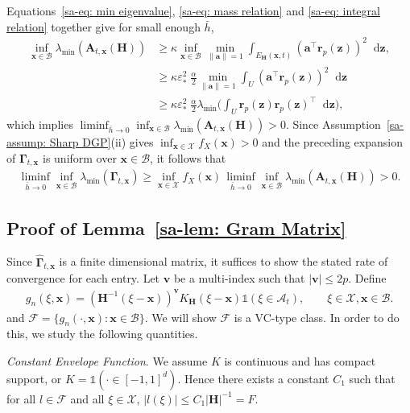 \documentclass[10pt]{article}
\newcommand{\Indicator}{\mathds{1}}
\newcommand{\dif}{\mathop{}\!\mathrm{d}}
\newcommand{\norm}[1]{\left\lVert#1\right\rVert}
\newcommand{\ba}{\mathbf{a}}
\newcommand{\bA}{\mathbf{A}}
\newcommand{\bH}{\mathbf{H}}
\newcommand{\br}{\mathbf{r}}
\newcommand{\bv}{\mathbf{v}}
\newcommand{\bx}{\mathbf{x}}
\newcommand{\bz}{\mathbf{z}}
\newcommand{\bGamma}{\boldsymbol{\Gamma}}
\newcommand{\A}{\mathcal{A}}
\newcommand{\B}{\mathcal{B}}
\newcommand{\F}{\mathcal{F}}
\newcommand{\X}{\mathcal{X}}
\begin{document}
Equations~\eqref{sa-eq: min eigenvalue}, \eqref{sa-eq: mass relation} and \eqref{sa-eq: integral relation} together give for small enough $\bar{h}$,
\begin{align*}
    \inf_{\bx \in \B}\lambda_{\min}(\bA_{t,\bx}(\bH))
    & \geq \kappa \inf_{\bx \in \B}\min_{\norm{\ba} = 1} \int_{E_{\bH}(\bx,t)} (\ba^{\top} \br_p(\bz))^2   \dif \bz, \\
    & \geq \kappa \varepsilon_*^2 \; \frac{\alpha}{2}  \min_{\norm{\ba} = 1} \int_{U} (\ba^{\top} \br_p(\bz))^2 \dif \bz \\
    & \geq \kappa \varepsilon_*^2 \; \frac{\alpha}{2}  \lambda_{\min} \Big(\int_U \br_p(\bz) \br_p(\bz)^{\top} \dif \bz \Big),
\end{align*}
which implies $\liminf_{\bar{h} \to 0} \inf_{\bx \in \B}\lambda_{\min}(\bA_{t,\bx}(\bH)) > 0$. Since Assumption~\ref{sa-assump: Sharp DGP}(ii) gives $\inf_{\bx\in\X}f_X(\bx)>0$ and the preceding expansion of $\bGamma_{t,\bx}$ is uniform over $\bx\in\B$, it follows that
\begin{align*}
    \liminf_{\bar h\to0}\inf_{\bx\in\B}\lambda_{\min}(\bGamma_{t,\bx})
    \geq
    \inf_{\bx\in\X}f_X(\bx)\,
    \liminf_{\bar h\to0}\inf_{\bx\in\B}\lambda_{\min}(\bA_{t,\bx}(\bH))
    >0.
\end{align*}


\subsection{Proof of Lemma~\ref{sa-lem: Gram Matrix}}

Since $\widehat{\bGamma}_{t,\bx}$ is a finite dimensional matrix, it suffices to show the stated rate of convergence for each entry. Let $\bv$ be a multi-index such that $|\bv| \leq 2 p$. Define
\begin{align*}
    g_n(\xi,\bx) = (\bH^{-1}(\xi - \bx))^{\bv} K_{\bH}(\xi - \bx)\Indicator(\xi \in \A_t), \qquad \xi \in \mathcal{X}, \bx \in \B.
\end{align*}
and $\F = \{g_n(\cdot, \bx): \bx \in \B\}$. We will show $\F$ is a VC-type class. In order to do this, we study the following quantities.

\medskip\textit{Constant Envelope Function}. We assume $K$ is continuous and has compact support, or $K = \Indicator(\cdot \in [-1,1]^d)$. Hence there exists a constant $C_1$ such that for all $l \in \mathcal{F}$ and all $\xi \in \X$, $|l(\xi)| \leq C_1 |\bH|^{-1} = F$.
\end{document}
